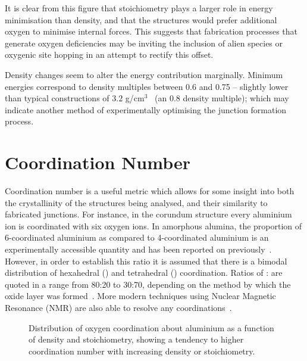 It is clear from this figure that stoichiometry plays a larger role in energy minimisation than density, and that the structures would prefer additional oxygen to minimise internal forces.
This suggests that fabrication processes that generate oxygen deficiencies may be inviting the inclusion of alien species or oxygenic site hopping in an attempt to rectify this offset.

Density changes seem to alter the energy contribution marginally.
Minimum energies correspond to density multiples between 0.6 and 0.75 -- slightly lower than typical constructions of $3.2$ g/cm$^\text{3}$~\cite{Barbour1998} (an 0.8 density multiple); which may indicate another method of experimentally optimising the junction formation process.

\section{Coordination Number}
Coordination number is a useful metric which allows for some insight into both the crystallinity of the structures being analysed, and their similarity to fabricated junctions. For instance, in the corundum structure every aluminium ion is coordinated with six oxygen ions. In amorphous alumina, the proportion of 6-coordinated aluminium as compared to 4-coordinated aluminium is an experimentally accessible quantity and has been reported on previously~\cite{ElMashri1983}. However, in order to establish this ratio it is assumed that there is a bimodal distribution of hexahedral () and tetrahedral () coordination. Ratios of : are quoted in a range from 80:20 to 30:70, depending on the method by which the oxide layer was formed~\cite{Bourdillon1984}. More modern techniques using Nuclear Magnetic Resonance (NMR) are also able to resolve any  coordinations~\cite{Lee2009}.


\begin{figure}[htp]
\centering
\resizebox{\textwidth}{!}{}
\caption[Oxygen Coordination]{\label{fig:coordinationnumber}Distribution of oxygen coordination about aluminium as a function of density and stoichiometry, showing a tendency to higher coordination number with increasing density or stoichiometry.}%
\end{figure}

